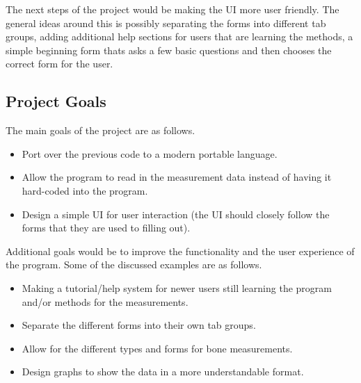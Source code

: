 \documentclass[12pt,letterpaper]{article}
\begin{document}
The next steps of the project would be making the UI more user friendly. The general ideas around this is possibly separating the forms into different tab groups, adding additional help sections for users that are learning the methods, a simple beginning form thats asks a few basic questions and then chooses the correct form for the user.

\subsection{Project Goals}

The main goals of the project are as follows.

\begin{itemize}

\item Port over the previous code to a modern portable language.
\item Allow the program to read in the measurement data instead of having it hard-coded into the program.
\item Design a simple UI for user interaction (the UI should closely follow the forms that they are used to filling out).

\end{itemize}

Additional goals would be to improve the functionality and the user experience of the program. Some of the discussed examples are as follows.

\begin{itemize}

\item Making a tutorial/help system for newer users still learning the program and/or methods for the measurements.
\item Separate the different forms into their own tab groups.
\item Allow for the different types and forms for bone measurements.
\item Design graphs to show the data in a more understandable format.
\end{itemize}
\end{document}
